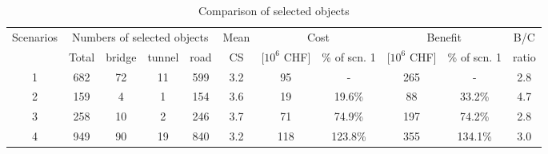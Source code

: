 \documentclass[a4paper,3p,times,authoryear]{elsarticle}
\begin{document}
\begin{table}[H]
\centering
\caption{Comparison of selected objects} \label{tbl:resultobje}
\small
\begin{tabular}{|l|l|l|l|l|l|l|l|l|l|l|}
\hline
\multicolumn{1}{|c|}{Scenarios} & \multicolumn{4}{c|}{Numbers of selected objects} & \multicolumn{1}{c|}{Mean} & \multicolumn{2}{c|}{Cost} & \multicolumn{2}{c|}{Benefit} & \multicolumn{1}{c|}{B/C} \\ 
\cline{2-5}\cline{7-10}
\multicolumn{1}{|c|}{} & \multicolumn{1}{c|}{Total} & \multicolumn{1}{c|}{bridge} & \multicolumn{1}{c|}{tunnel} & \multicolumn{1}{c|}{road} & \multicolumn{1}{c|}{CS} & \multicolumn{1}{c|}{[$10^6$ CHF]} & \multicolumn{1}{c|}{\% of scn. 1} & \multicolumn{1}{c|}{[$10^6$ CHF]} & \multicolumn{1}{c|}{\% of scn. 1} & \multicolumn{1}{c|}{ratio} \\ 
\hline
\multicolumn{1}{|c|}{1} & \multicolumn{1}{c|}{682} & \multicolumn{1}{c|}{72} & \multicolumn{1}{c|}{11} & \multicolumn{1}{c|}{599} & \multicolumn{1}{c|}{3.2} & \multicolumn{1}{c|}{95} & \multicolumn{1}{c|}{-} & \multicolumn{1}{c|}{265} & \multicolumn{1}{c|}{-} & \multicolumn{1}{c|}{2.8} \\ 
\hline
\multicolumn{1}{|c|}{2} & \multicolumn{1}{c|}{159} & \multicolumn{1}{c|}{4} & \multicolumn{1}{c|}{1} & \multicolumn{1}{c|}{154} & \multicolumn{1}{c|}{3.6} & \multicolumn{1}{c|}{19} & \multicolumn{1}{c|}{19.6\%} & \multicolumn{1}{c|}{88} & \multicolumn{1}{c|}{33.2\%} & \multicolumn{1}{c|}{4.7} \\ 
\hline
\multicolumn{1}{|c|}{3} & \multicolumn{1}{c|}{258} & \multicolumn{1}{c|}{10} & \multicolumn{1}{c|}{2} & \multicolumn{1}{c|}{246} & \multicolumn{1}{c|}{3.7} & \multicolumn{1}{c|}{71} & \multicolumn{1}{c|}{74.9\%} & \multicolumn{1}{c|}{197} & \multicolumn{1}{c|}{74.2\%} & \multicolumn{1}{c|}{2.8} \\ 
\hline
\multicolumn{1}{|c|}{4} & \multicolumn{1}{c|}{949} & \multicolumn{1}{c|}{90} & \multicolumn{1}{c|}{19} & \multicolumn{1}{c|}{840} & \multicolumn{1}{c|}{3.2} & \multicolumn{1}{c|}{118} & \multicolumn{1}{c|}{123.8\%} & \multicolumn{1}{c|}{355} & \multicolumn{1}{c|}{134.1\%} & \multicolumn{1}{c|}{3.0} \\ 
\hline
\end{tabular}
\end{table}
\end{document}
